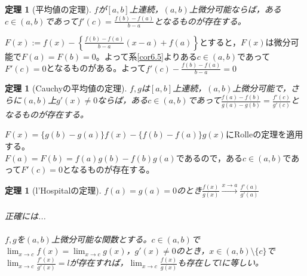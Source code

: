 \documentclass[dvipdfmx,a4j,10pt]{jsarticle}
\makeatletter
\theoremstyle{mystyle1}
\newtheorem{thm}[dfn]{定理}
\theoremstyle{mystyle2}
\renewenvironment{proof}[1][\proofname]{\par
  \pushQED{\qed}%
  \normalfont
  \topsep6\p@\@plus6\p@ \trivlist
  \item[\hskip\labelsep{\bfseries\sffamily #1}]\ignorespaces
}{%
  \popQED\endtrivlist\@endpefalse
}
\renewcommand\proofname{証明}
\makeatother
\begin{document}
\begin{framed}
    \begin{thm}[平均値の定理]\label{thm6.6}
        $f$が$[a,b]$上連続，$(a,b)$上微分可能ならば，ある$c\in (a,b)$であって$\displaystyle f'(c)=\frac{f(b)-f(a)}{b-a}$となるものが存在する。
    \end{thm}
\end{framed}

\begin{proof}[定理\ref{thm6.6}の証明]
$\displaystyle F(x):=f(x)-\left\{\frac{f(b)-f(a)}{b-a}(x-a)+f(a)\right\}$とすると，$F(x)$は微分可能で$F(a)=F(b)=0$。よって系\ref{cor6.5}よりある$c\in (a,b)$であって$F'(c)=0$となるものがある。よって$\displaystyle f'(c)-\frac{f(b)-f(a)}{b-a}=0$
\end{proof}

\begin{framed}
    \begin{thm}[Cauchyの平均値の定理]\label{thm6.7}
        $f,g$は$[a,b]$上連続，$(a,b)$上微分可能で，さらに$(a,b)$上$g'(x)\neq0$\footnotemark ならば，ある$c\in (a,b)$であって$\displaystyle \frac{f(a)-f(b)}{g(a)-g(b)}=\frac{f'(c)}{g'(c)}$となるものが存在する。
    \end{thm}
\end{framed}

\begin{proof}[定理\ref{thm6.7}の証明]
    $F(x)=\{ g(b)-g(a)\}f(x)-\{f(b)-f(a)\}g(x)$にRolleの定理を適用する。\\
    $F(a)=F(b)=f(a)g(b)-f(b)g(a)$であるので，ある$c\in (a,b)$であって$F'(c)=0$となるものが存在する。
\end{proof}

\begin{framed}
    \begin{thm}[l'Hospitalの定理]\label{thm6.7_no_ouyou}
        $f(a)=g(a)=0$のとき$\displaystyle \frac{f(x)}{g(x)}\overset{x\to a}{\longrightarrow}\frac{f'(a)}{g'(a)}$\\
        \\
        正確には...\\
        \\
        $f,g$を$(a,b)$上微分可能な関数とする。$c\in (a,b)$で$\displaystyle\lim_{x\to c}f(x)=\lim_{x\to c}g(x)$，$g'(x)\neq0$のとき，$x\in (a,b) \setminus \{c\}$で$\displaystyle \lim_{x\to c}\frac{f'(x)}{g'(x)}=l$が存在すれば，$\displaystyle \lim_{x\to c}\frac{f(x)}{g(x)}$も存在して$l$に等しい。
    \end{thm}
\end{framed}
\end{document}
